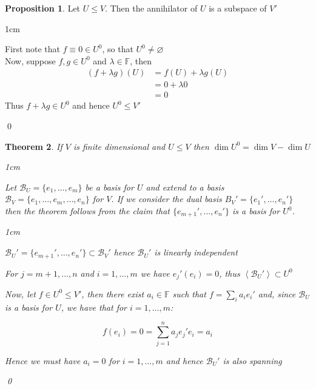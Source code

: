 \documentclass[11pt, a4paper]{report}
\makeatletter
\numberwithin{equation}{section}
\renewcommand{\emptyset}{\varnothing}
\newcommand{\B}{\mathcal{B}}
\newcommand{\F}{\mathbb{F}}
\newcommand{\spn}[1]{\left\langle #1 \right\rangle}
\numberwithin{equation}{subsection}
\theoremstyle{plain}
\newtheorem{thm}{Theorem}[chapter] %
\theoremstyle{definition}
\newtheorem{prop}[thm]{Proposition}
\theoremstyle{remark}
\newtheorem*{prf}{Proof}
\renewenvironment{prf}[1][\proofname]{\par
  \vspace{-\topsep}%
  \normalfont
  \topsep0pt \partopsep0pt %
  \trivlist
  \item[\hskip\labelsep
        \itshape
    #1\@addpunct{.}]\ignorespaces
}{%
  \popQED\endtrivlist\@endpefalse
  \addvspace{6pt plus 6pt} %
}
\newcommand{\pr}[1]{\begin{adjustwidth}{1cm}{} \begin{prf} #1 \end{prf} \end{adjustwidth}}
\makeatother
\begin{document}
\begin{prop}
Let $U \leq V$. Then the annihilator of $U$ is a subspace of $V'$

\pr{
First note that $f \equiv 0 \in U^0$, so that $U^0 \neq \emptyset$\\
Now, suppose $f,g \in U^0$ and $\lambda \in \F$, then
\begin{align*}
(f + \lambda g)(U) 	&= f(U) + \lambda g(U)\\
					&= 0 + \lambda 0 \tag{$f,g \in U^0$}\\
					&= 0
\end{align*}
Thus $f + \lambda g \in U^0$ and hence $U^0 \leq V'$
}\qed
\end{prop}

\newpage

\begin{thm}
If $V$ is finite dimensional and $U \leq V$ then $\dim U^0 = \dim V - \dim U$

\pr{
Let $\B_U = \{ e_1, \ldots, e_m \}$ be a basis for $U$ and extend to a basis $\B_V = \{ e_1, \ldots, e_m, \ldots, e_n \}$ for $V$. If we consider the dual basis $B_V' = \{ e_1', \ldots, e_n' \}$ then the theorem follows from the claim that $\{ e_{m+1}', \ldots, e_n' \}$ is a basis for $U^0$.

\pr{
$\B_U' = \{ e_{m+1}', \ldots, e_n' \} \subset \B_V'$ hence $\B_U'$ is linearly independent

For $j = m+1, \ldots, n$ and $i = 1, \ldots, m$ we have $e_j'(e_i) = 0$, thus $\spn{\B_U'} \subset U^0$

Now, let $f \in U^0 \leq V'$, then there exist $a_i \in \F$ such that
$f = \sum_i a_i e_i'$ and, since $\B_U$ is a basis for $U$, we have that for $i = 1, \ldots, m$:

$$f(e_i) = 0 = \sum_{j=1}^n a_j e_j' e_i = a_i$$

Hence we must have $a_i = 0$ for $i = 1, \ldots, m$ and hence $\B_U'$ is also spanning
} \qed
}
\end{thm}
\end{document}
